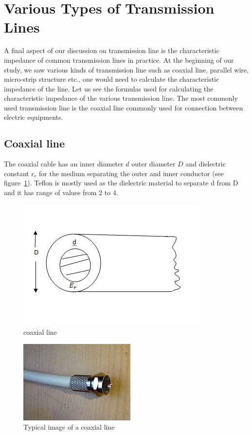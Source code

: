 \section{Various Types of Transmission Lines}\label{lec:lec15}
A final aspect of our discussion on transmission line is the characteristic impedance of common transmission lines in practice. At the beginning of our study, we saw various kinds of transmission line such as coaxial line, parallel wire, micro-strip structure etc., one would need to calculate the characteristic impedance of the line. Let us see the formulas used for calculating the characteristic impedance of the various transmission line. The most commonly used transmission line is the coaxial line commonly used for connection between electric equipments.

\subsection{Coaxial line}
The coaxial cable has an inner diameter $d$ outer diameter $D$ and dielectric constant $\epsilon_r$ for the medium separating the outer and inner conductor (see figure~\ref{fig:coaxialcable1}). Teflon is mostly used as the dielectric material to separate d from D and it has range of values from 2 to 4.
\begin{figure}[h]
\centering
\includegraphics[width=1\linewidth]{graphics/coaxialcable1}
\caption{coaxial line}
\label{fig:coaxialcable1}
\end{figure}
\begin{figure}[h]
\centering
\includegraphics[scale=0.8]{graphics/coaxialcable}
\caption{Typical image of a coaxial line}
\end{figure}

